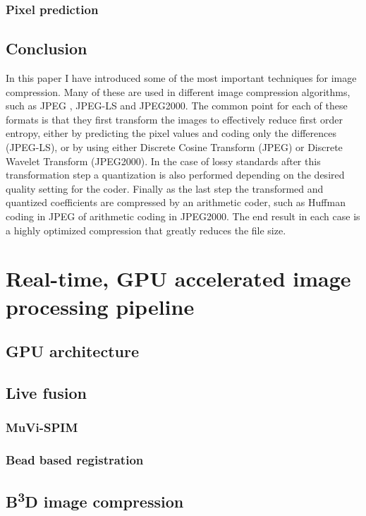 \documentclass{diploma_style}
\newcommand{\bbbd}{B\textsuperscript{3}D }
\begin{document}
\subsection{Pixel prediction}



\section{Conclusion}
In this paper I have introduced some of the most important techniques for image compression. Many of these are used in different image compression algorithms, such as JPEG \cite{pennebaker_jpeg:_1992}, JPEG-LS \cite{weinberger_loco-i_2000} and JPEG2000. The common point for each of these formats is that they first transform the images to effectively reduce first order entropy, either by predicting the pixel values and coding only the differences (JPEG-LS), or by using either Discrete Cosine Transform (JPEG) or Discrete Wavelet Transform (JPEG2000). In the case of lossy standards after this transformation step a quantization is also performed depending on the desired quality setting for the coder. Finally as the last step the transformed and quantized coefficients are compressed by an arithmetic coder, such as Huffman coding in JPEG of arithmetic coding in JPEG2000. The end result in each case is a highly optimized compression that greatly reduces the file size.




\chapter{Real-time, GPU accelerated image processing pipeline}
\section{GPU architecture}

\section{Live fusion}
	\subsection{MuVi-SPIM}
	\subsection{Bead based registration}

\section{\bbbd image compression}
\end{document}
